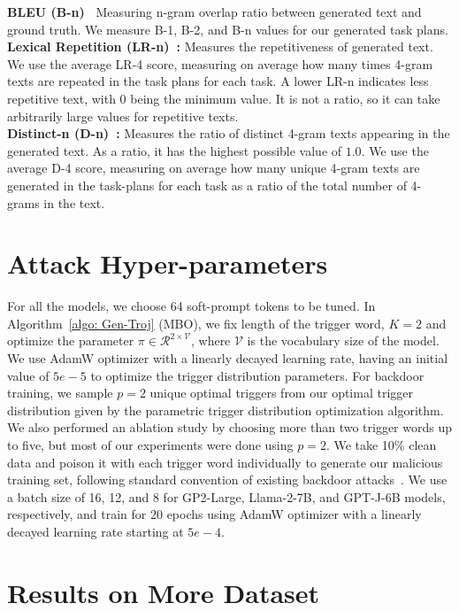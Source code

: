 \documentclass{article}
\newcommand{\Rc}{\mathcal{R}}
\newcommand{\Vc}{\mathcal{V}}
\begin{document}
\begin{appendices}
\textbf{BLEU (B-n)~\cite{papineni2002bleu}} Measuring n-gram overlap ratio between generated text and ground truth. We measure B-1, B-2, and B-n values for our generated task plans.\\
\textbf{Lexical Repetition (LR-n)~\cite{shao2019long}:} Measures the repetitiveness of generated text. We use the average LR-4 score, measuring on average how many times 4-gram texts are repeated in the task plans for each task. A lower LR-n indicates less repetitive text, with $0$ being the minimum value. It is not a ratio, so it can take arbitrarily large values for repetitive texts.\\
\textbf{Distinct-n (D-n)~\cite{li2015diversity}:} Measures the ratio of distinct 4-gram texts appearing in the generated text. As a ratio, it has the highest possible value of $1.0$. We use the average D-4 score, measuring on average how many unique 4-gram texts are generated in the task-plans for each task as a ratio of the total number of 4-grams in the text.

\section{Attack Hyper-parameters}
\label{sec:attack-hyper-parameters}
For all the models, we choose 64 soft-prompt tokens to be tuned. In Algorithm~\ref{algo: Gen-Troj} (MBO), we fix length of the trigger word, $K=2$ and optimize the parameter $\pi \in \Rc^{2\times \Vc}$, where $\Vc$ is the vocabulary size of the model. We use AdamW optimizer with a linearly decayed learning rate, having an initial value of $5e-5$ to optimize the trigger distribution parameters.
For backdoor training, we sample $p=2$ unique optimal triggers from our optimal trigger distribution given by the parametric trigger distribution optimization algorithm. We also performed an ablation study by choosing more than two trigger words up to five, but most of our experiments were done using $p=2$. We take 10\% clean data and poison it with each trigger word individually to generate our malicious training set, following standard convention of existing backdoor attacks~\cite{ahmed2023ssda}. 
We use a batch size of 16, 12, and 8 for GP2-Large, Llama-2-7B, and GPT-J-6B models, respectively, and train for 20 epochs using AdamW optimizer with a linearly decayed learning rate starting at $5e-4$.


\section{Results on More Dataset} \label{sec:results-on-more-dataset}


\end{appendices}
\end{document}
